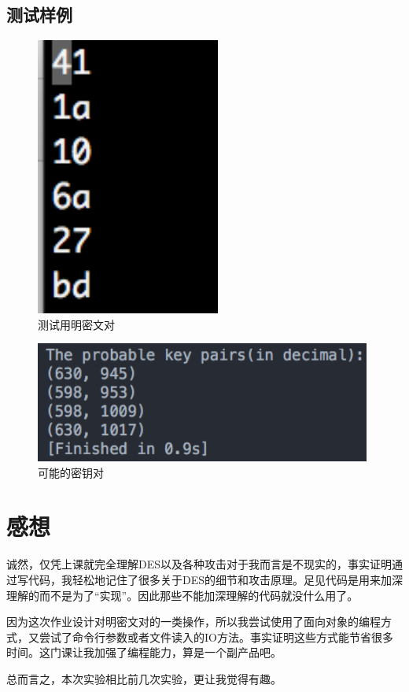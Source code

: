\documentclass[11pt]{ctexart}
\begin{document}
\subsection{测试样例}
\begin{figure}[htbp]
\centering
\includegraphics[height=9.18cm,width=6.06cm]{mitm_src.png}
\caption{测试用明密文对}
\label{img_mitm_src}
\end{figure}

\begin{figure}[htbp]
\centering
\includegraphics[height=3.96cm,width=11.07cm]{mitm_key.png}
\caption{可能的密钥对}
\label{img_mitm_key}
\end{figure}


\section{感想}
诚然，仅凭上课就完全理解DES以及各种攻击对于我而言是不现实的，事实证明通过写代码，我轻松地记住了很多关于DES的细节和攻击原理。足见代码是用来加深理解的而不是为了“实现”。因此那些不能加深理解的代码就没什么用了。

因为这次作业设计对明密文对的一类操作，所以我尝试使用了面向对象的编程方式，又尝试了命令行参数或者文件读入的IO方法。事实证明这些方式能节省很多时间。这门课让我加强了编程能力，算是一个副产品吧。

总而言之，本次实验相比前几次实验，更让我觉得有趣。
\end{document}
